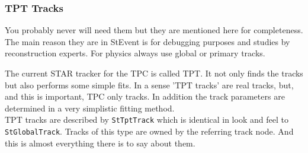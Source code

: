\documentclass[twoside]{article}
\begin{document}
\subsubsection{TPT Tracks}
\label{sec:tptTracks} 
You probably never will need them but they are mentioned here for completeness.
The main reason they are in StEvent is for debugging purposes and studies by reconstruction
experts. For physics always use global or primary tracks. 

The current STAR tracker for the TPC is called TPT. It not only finds the tracks
but also performs some simple fits. In a sense 'TPT tracks' are real tracks, but,
and this is important, TPC only tracks. In addition the track parameters are determined
in a very simplistic fitting method. \\
TPT tracks are described by \texttt{StTptTrack} which is identical in look and feel to
\texttt{StGlobalTrack}. Tracks of this type are owned by the referring track node.
And this is almost everything there is to say about them.
\end{document}
